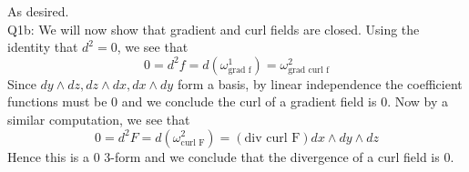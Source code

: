 \documentclass[letterpaper]{article}
\begin{document}
As desired. 
\newline \\ Q1b: We will now show that gradient and curl fields are closed. Using the identity that $d^2=0$, we see that 
$$0 = d^2 f = d(\omega_{\text{grad f}}^1) = \omega_{\text{grad curl f}}^2$$
Since $dy\wedge dz,dz\wedge dx,dx\wedge dy$ form a basis, by linear independence the coefficient functions must be 0 and we conclude the curl of a gradient field is 0.
Now by a similar computation, we see that 
$$0 = d^2F =d(\omega_{\text{curl F}}^2) = (\text{div curl F})dx\wedge dy \wedge dz$$
Hence this is a 0 3-form and we conclude that the divergence of a curl field is 0. 
\end{document}
